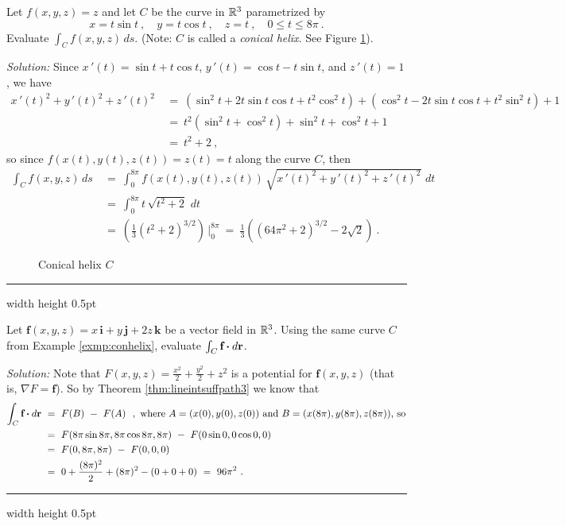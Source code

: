 \begin{exmp}\label{exmp:conhelix}
 Let $f(x,y,z) = z$ and let $C$ be the curve in $\mathbb{R}^{3}$ parametrized by
 \begin{displaymath}
  x=t\sin t ~,\quad y=t\cos t ~,\quad z=t ~,\quad 0\le t \le 8\pi ~.
 \end{displaymath}
 Evaluate $\int_C f(x,y,z)\,ds$. (Note:
 $C$ is called a \emph{conical helix}. See Figure \ref{fig:conhelix}).\smallskip
 \par\noindent \emph{Solution:} Since $x\,'(t)=\sin t + t\cos t$, $y\,'(t)=\cos t - t\sin t$, and $z\,'(t)=1$, we have
 \begin{align*}
  x\,'(t)^2 + y\,'(t)^2 + z\,'(t)^2 ~&=~ (\sin^2 t + 2t\sin t \cos t + t^2 \cos^2 t) + (\cos^2 t - 2t\sin t \cos t +
   t^2 \sin^2 t) + 1\\
   &=~ t^2 (\sin^2 t + \cos^2 t) + \sin^2 t + \cos^2 t + 1\\
   &=~ t^2 + 2 ~,
 \end{align*}
 so since $f(x(t),y(t),z(t)) = z(t) = t$ along the curve $C$, then
 \begin{align*}
  \int_C f(x,y,z)\,ds ~&=~ \int_0^{8\pi} f(x(t),y(t),z(t)) \,\sqrt{x\,'(t)^2 + y\,'(t)^2 + z\,'(t)^2}\,\,dt\\
   &=~ \int_0^{8\pi} t\,\sqrt{t^2 + 2}\,\,dt\\
   &=~ \left( \frac{1}{3} (t^2 + 2)^{3/2} \right) \,\Bigg|_0^{8\pi}
   ~=~ \frac{1}{3} \left( (64\pi^2 + 2)^{3/2} - 2\sqrt{2} \right) ~.
 \end{align*}
 \begin{figure}[h]
  \begin{center}
   
  \end{center}
  \caption[]{\quad Conical helix $C$}
  \label{fig:conhelix}
 \end{figure}
\end{exmp}\smallskip
\hrule width \textwidth height 0.5pt
\begin{exmp}
 Let $\mathbf{f}(x,y,z) = x\,\mathbf{i} + y\,\mathbf{j} + 2z\,\mathbf{k}$ be a vector field in $\mathbb{R}^{3}$.
 Using the same curve $C$ from Example \ref{exmp:conhelix}, evaluate $\int_{C} \textbf{f} \bm{\cdot} d\textbf{r}$.\smallskip
\par\noindent \emph{Solution:} 
Note that $F(x,y,z)=\frac{x^2}{2}+\frac{y^2}{2}+z^2$ is a potential for $\mathbf{f}(x,y,z)$ 
(that is, $\nabla F = \mathbf{f}$). 
So by Theorem \ref{thm:lineintsuffpath3} we know that
 \begin{align*}
  \int_{C} \textbf{f} \bm{\cdot} d\textbf{r} ~&=~ F(B) ~-~ F(A) ~~,~\text{where $A=(x(0),y(0),z(0))$ and $B=(x(8\pi),y(8\pi),z(8\pi))$, so}\\
   &=~ F(8\pi\sin 8\pi,8\pi\cos 8\pi,8\pi) ~-~ F(0\sin 0,0\cos 0,0)\\
   &=~ F(0,8\pi,8\pi) ~-~ F(0,0,0)\\
   &=~ 0+\frac{(8\pi)^2}{2} + (8\pi)^2 - (0+0+0)
   ~=~ 96\pi^2 ~.
 \end{align*}
\end{exmp}
\hrule width \textwidth height 0.5pt
\medskip

